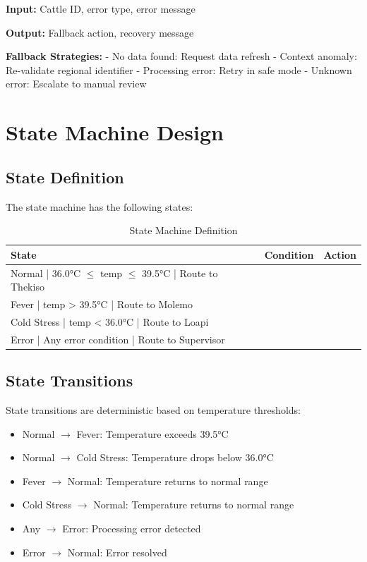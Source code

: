 \textbf{Input:} Cattle ID, error type, error message

\textbf{Output:} Fallback action, recovery message

\textbf{Fallback Strategies:}
- No data found: Request data refresh
- Context anomaly: Re-validate regional identifier
- Processing error: Retry in safe mode
- Unknown error: Escalate to manual review

\section{State Machine Design}

\subsection{State Definition}

The state machine has the following states:

\begin{table}[H]
\centering
\begin{tabular}{|l|l|l|}
\hline
\textbf{State} & \textbf{Condition} & \textbf{Action} \\
\hline
Normal | 36.0°C $\leq$ temp $\leq$ 39.5°C | Route to Thekiso \\
Fever | temp > 39.5°C | Route to Molemo \\
Cold Stress | temp < 36.0°C | Route to Loapi \\
Error | Any error condition | Route to Supervisor \\
\hline
\end{tabular}
\caption{State Machine Definition}
\end{table}

\subsection{State Transitions}

State transitions are deterministic based on temperature thresholds:

\begin{itemize}
    \item Normal $\rightarrow$ Fever: Temperature exceeds 39.5°C
    \item Normal $\rightarrow$ Cold Stress: Temperature drops below 36.0°C
    \item Fever $\rightarrow$ Normal: Temperature returns to normal range
    \item Cold Stress $\rightarrow$ Normal: Temperature returns to normal range
    \item Any $\rightarrow$ Error: Processing error detected
    \item Error $\rightarrow$ Normal: Error resolved
\end{itemize}

